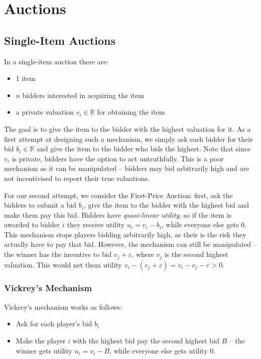 \section{Auctions}
	\subsection{Single-Item Auctions}
	In a single-item auction there are:
	\begin{itemize}
		\itemsep0em 
		\item 1 item
		\item $n$ bidders interested in acquiring the item
		\item a private valuation $v_i \in \mathbb{R}$ for obtaining the item
	\end{itemize}

	The goal is to give the item to the bidder with the highest valuation for
	it. As a first attempt at designing such a mechanism, we simply ask each
	bidder for their bid $b_i \in \mathbb{R}$ and give the item to the bidder
	who bids the highest. Note that since $v_i$ is private, bidders have the
	option to act untruthfully. This is a poor mechanism as it can be
	manipulated -- bidders may bid arbitrarily high and are not incentivised to
	report their true valuations.

	For our second attempt, we consider the First-Price Auction: first, ask the
	bidders to submit a bid $b_i$, give the item to the bidder with the highest
	bid and make them pay this bid. Bidders have \emph{quasi-linear utility},
	so if the item is awarded to bidder $i$ they receive utility $u_i = v_i -
	b_i$, while everyone else gets 0. This mechanism stops players bidding
	arbitrarily high, as their is the risk they actually have to pay that bid.
	However, the mechanism can still be manipulated -- the winner has the
	incentive to bid $v_j + \varepsilon$, where $v_j$ is the second highest
	valuation. This would net them utility $v_i - (v_j + \varepsilon) = v_i -
	v_j - \varepsilon > 0$.

	\subsubsection{Vickrey's Mechanism}
		Vickrey's mechanism works as follows:
		\begin{itemize}
			\itemsep0em
			\item Ask for each player's bid $b_i$
			\item Make the player $i$ with the highest bid pay the second
				highest bid $B$ -- the winner gets utility $u_i = v_i - B$,
				while everyone else gets utility 0.
		\end{itemize}

